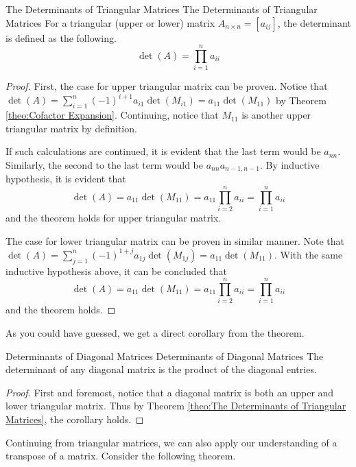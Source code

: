 \documentclass[../main.tex]{subfiles}
\begin{document}
\begin{theorem}{The Determinants of Triangular Matrices}
{The Determinants of Triangular Matrices}
For a triangular (upper or lower) matrix $A_{n \times n} = [a_{ij}]$,
the determinant is defined as the following.
\[
\det(A)
= \prod_{i=1}^n a_{ii}
\]
\end{theorem}
\begin{proof}
First, the case for upper triangular matrix can be proven. Notice that
$\det(A) = \sum_{i=1}^n (-1)^{i + 1} a_{i1} \det(M_{i1}) =
a_{11} \det(M_{11})$ by Theorem \ref{theo:Cofactor Expansion}.
Continuing, notice that $M_{11}$ is another upper triangular matrix
by definition.

If such calculations are continued, it is evident that the last
term would be $a_{nn}$. Similarly, the second to the last term
would be $a_{nn} a_{n-1,n-1}$. By inductive hypothesis, it is
evident that
\[
\det(A)
= a_{11} \det(M_{11})
= a_{11} \prod_{i=2}^n a_{ii}
= \prod_{i=1}^n a_{ii}
\]
and the theorem holds for upper triangular matrix.

The case for lower triangular matrix can be proven in similar
manner. Note that $\det(A) = \sum_{j=1}^n (-1)^{1 + j} a_{1j}
\det(M_{1j}) = a_{11} \det(M_{11})$. With the same inductive
hypothesis above, it can be concluded that
\[
\det(A)
= a_{11} \det(M_{11})
= a_{11} \prod_{i=2}^n a_{ii}
= \prod_{i=1}^n a_{ii}
\]
and the theorem holds.
\end{proof}

As you could have guessed, we get a direct corollary from the
theorem.

\begin{corollary}{Determinants of Diagonal Matrices}
{Determinants of Diagonal Matrices}
The determinant of any diagonal matrix is the product of the
diagonal entries.
\end{corollary}
\begin{proof}
First and foremost, notice that a diagonal matrix is both
an upper and lower triangular matrix. Thus by Theorem \ref{theo:The
Determinants of Triangular Matrices}, the corollary holds.
\end{proof}

Continuing from triangular matrices, we can also apply our
understanding of a transpose of a matrix. Consider the following
theorem.
\end{document}
